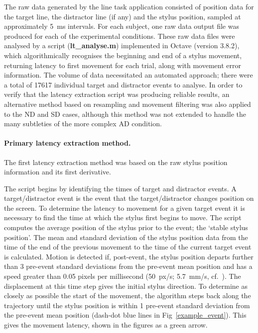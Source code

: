 \documentclass[10pt,letterpaper]{article}
\newcommand{\filename}[1]{\textsf{\textbf{#1}}}
\begin{document}
The raw data generated by the line task application consisted of
position data for the target line, the distractor line (if any) and
the stylus position, sampled at approximately 5~ms intervals. For each
subject, one raw data output file was produced for each of the
experimental conditions.  These raw data files were analysed by a
script (\filename{lt\_analyse.m}) implemented in Octave (version
3.8.2), which algorithmically recognises the beginning and end of a
stylus movement, returning latency to first movement for each trial,
along with movement error information. The volume of data necessitated
an automated approach; there were a total of 17617 individual target
and distractor events to analyse. In order to verify that the latency
extraction script was producing reliable results, an alternative
method based on resampling and movement filtering was also applied to
the ND and SD cases, although this method was not extended to handle
the many subtleties of the more complex AD condition.

\paragraph{Primary latency extraction method.} The first latency extraction
method was based on the raw stylus position information and its first
derivative.

The script begins by identifying the times of target and distractor
events. A target/distractor event is the event that the
target/distractor changes position on the screen. To determine the
latency to movement for a given target event it is necessary to find
the time at which the stylus first begins to move. The script computes
the average position of the stylus prior to the event; the `stable
stylus position'. The mean and standard deviation of the stylus
position data from the time of the end of the previous movement to the
time of the current target event is calculated.  Motion is detected
if, post-event, the stylus position departs further than 3 pre-event
standard deviations from the pre-event mean position and has a speed
greater than 0.05 pixels per millisecond (50~px/s; 5.7~mm/s,
cf.~\cite{prablanc_optimal_1979}).  The displacement at this time step
gives the initial stylus direction. To determine as closely as
possible the start of the movement, the algorithm steps back along the
trajectory until the stylus position is within 1 pre-event standard
deviation from the pre-event mean position (dash-dot blue lines in
Fig~\ref{example_event}). This gives the movement latency, shown in
the figures as a green arrow.
\end{document}
